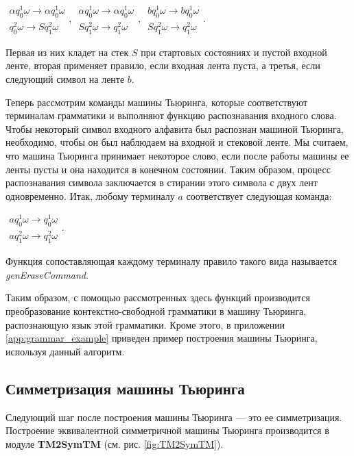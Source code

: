 \documentclass[14pt]{matmex-diploma-custom}
\begin{document}
$\begin{array}{lcl}
    \alpha q_0^1 \omega \to \alpha q_0^1 \omega \\
    q_0^2 \omega \to S q_1^2 \omega 
\end{array}$,
$\begin{array}{lcl}
    \alpha q_0^1 \omega \to \alpha q_0^1 \omega \\
    S q_1^2 \omega \to q_1^2 \omega 
\end{array}$,
$\begin{array}{lcl}
    b q_0^1 \omega \to b q_0^1 \omega \\
    S q_1^2 \omega \to q_1^2 \omega 
\end{array}$.

Первая из них кладет на стек $S$ при стартовых состояниях и пустой входной ленте, вторая применяет правило, если входная лента пуста, а третья, если следующий символ на ленте $b$.  

Теперь рассмотрим команды машины Тьюринга, которые соответствуют терминалам грамматики и выполняют
функцию распознавания входного слова. Чтобы некоторый символ входного алфавита был распознан 
машиной Тьюринга, необходимо, чтобы он был наблюдаем на входной и стековой ленте. Мы считаем, что
машина Тьюринга принимает некоторое слово, если после работы машины ее ленты пусты и она находится в
конечном состоянии. Таким образом, процесс распознавания символа заключается в стирании этого символа
с двух лент одновременно. Итак, любому терминалу $a$ соответствует следующая команда:

$\begin{array}{lcl}
    a q_0^1 \omega \to q_0^1 \omega \\
    a q_1^2 \omega \to q_1^2 \omega 
\end{array}$. 

Функция сопоставляющая каждому терминалу правило такого вида называется \textit{genEraseCommand}.

Таким образом, с помощью рассмотренных здесь функций производится преобразование контекстно-свободной грамматики в машину Тьюринга, распознающую язык этой грамматики. Кроме этого, в приложении \ref{app:grammar_example} приведен пример построения машины Тьюринга, используя данный алгоритм. 

\subsection{Симметризация машины Тьюринга}
Следующий шаг после построения машины Тьюринга --- это ее симметризация. Построение эквивалентной симметричной машины Тьюринга производится в модуле \textbf{TM2SymTM} (см. рис. \ref{fig:TM2SymTM}).
\end{document}
